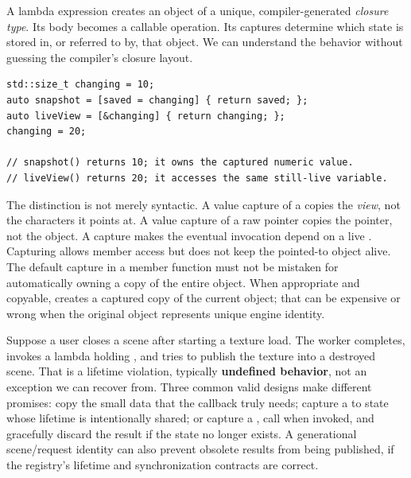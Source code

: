\hypertarget{01-foundations-i-ch004-a-lambda-is-a-created-object-and-its-capture-is-a-lifetime-contract}{}

A lambda expression creates an object of a unique, compiler-generated \emph{closure type}. Its body becomes a callable operation. Its captures determine which state is stored in, or referred to by, that object. We can understand the behavior without guessing the compiler's closure layout.

\begin{verbatim}
std::size_t changing = 10;
auto snapshot = [saved = changing] { return saved; };
auto liveView = [&changing] { return changing; };
changing = 20;

// snapshot() returns 10; it owns the captured numeric value.
// liveView() returns 20; it accesses the same still-live variable.
\end{verbatim}

The distinction is not merely syntactic. A value capture of a  copies the \emph{view}, not the characters it points at. A value capture of a raw pointer copies the pointer, not the object. A \BookInlineCode{{{[}}{\&}{s}{c}{e}{n}{e}{{]}}}{{[}\&scene{]}} capture makes the eventual invocation depend on a live . Capturing  allows member access but does not keep the pointed-to object alive. The \BookInlineCode{{{[}}{=}{{]}}}{{[}={]}} default capture in a member function must not be mistaken for automatically owning a copy of the entire object. When appropriate and copyable, \BookInlineCode{{{[}}{*}{t}{h}{i}{s}{{]}}}{{[}*this{]}} creates a captured copy of the current object; that can be expensive or wrong when the original object represents unique engine identity.

Suppose a user closes a scene after starting a texture load. The worker completes, invokes a lambda holding \BookInlineCode{{{[}}{\&}{s}{c}{e}{n}{e}{{]}}}{{[}\&scene{]}}, and tries to publish the texture into a destroyed scene. That is a lifetime violation, typically \textbf{undefined behavior}, not an exception we can recover from. Three common valid designs make different promises: copy the small data that the callback truly needs; capture a  to state whose lifetime is intentionally shared; or capture a , call  when invoked, and gracefully discard the result if the state no longer exists. A generational scene/request identity can also prevent obsolete results from being published, if the registry's lifetime and synchronization contracts are correct.

